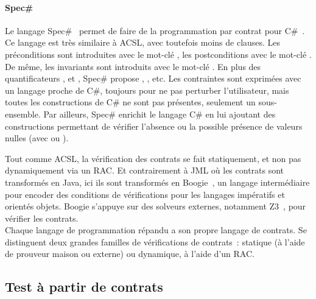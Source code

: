 \paragraph{Spec\#} Le langage Spec\#~ permet de faire de la
programmation par contrat pour C\#~. Ce langage est très similaire
à ACSL, avec toutefois moins de clauses. Les préconditions sont introduites avec
le mot-clé , les postconditions avec le mot-clé .
De même, les invariants sont introduits avec le mot-clé . En
plus des quantificateurs ,  et ,
Spec\# propose , ,  etc. Les contraintes sont
exprimées avec un langage proche de C\#, toujours pour ne pas perturber
l'utilisateur, mais toutes les constructions de C\# ne sont pas présentes,
seulement un sous-ensemble.  Par ailleurs, Spec\# enrichit le langage C\# en lui
ajoutant des constructions permettant de vérifier l'absence ou la possible
présence de valeurs nulles (avec \code{!} ou ).

Tout comme ACSL, la vérification des contrats se fait statiquement, et non pas
dynamiquement via un RAC. Et contrairement à JML où les contrats sont
transformés en Java, ici ils sont transformés en Boogie~,
un langage intermédiaire pour encoder des conditions de vérifications pour les
langages impératifs et orientés objets. Boogie s'appuye sur des solveurs
externes, notamment Z3~, pour vérifier les contrats. \\

Chaque langage de programmation répandu a son propre langage de contrats. Se
distinguent deux grandes familles de vérifications de contrats~: statique (à
l'aide de prouveur maison ou externe) ou dynamique, à l'aide d'un RAC. \\


\subsection{Test à partir de contrats}
\label{subsection:sota:cbt}

